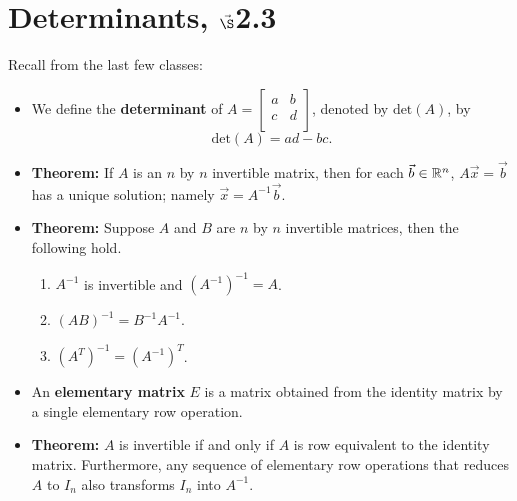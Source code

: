 


%

%
%

\section{{Determinants, $\vec\S$2.3}}%
% 

%
\thispagestyle{fancy}

Recall from the last few classes:

\begin{itemize}
\item We define the {\bf determinant} of $A=\begin{bmatrix} a & b \\ c & d\\ \end{bmatrix}$, denoted by $\text{det}(A)$, by $$\text{det}(A)=ad-bc.$$
\item {\bf Theorem:} If $A$ is an $n$ by $n$ invertible matrix, then for each $\vec{b}\in \mathbb{R}^n$, $A\vec{x}=\vec{b}$ has a unique solution; namely $\vec{x}=A^{-1}\vec{b}$.
\item {\bf Theorem:} Suppose $A$ and $B$ are $n$ by $n$ invertible matrices, then the following hold. 
\begin{enumerate}
\item $A^{-1}$ is invertible and $(A^{-1})^{-1}=A$.
\item $(AB)^{-1}=B^{-1} A^{-1}$.
\item $(A^{T})^{-1}=(A^{-1})^{T}$.
\end{enumerate}
\item An {\bf elementary matrix} $E$ is a matrix obtained from the identity matrix by a single elementary row operation.
 \item {\bf Theorem:} $A$ is invertible if and only if $A$ is row equivalent to the identity matrix. Furthermore, any sequence of elementary row operations that reduces $A$ to $I_n$ also transforms $I_n$ into $A^{-1}$.
\end{itemize}

\newpage





